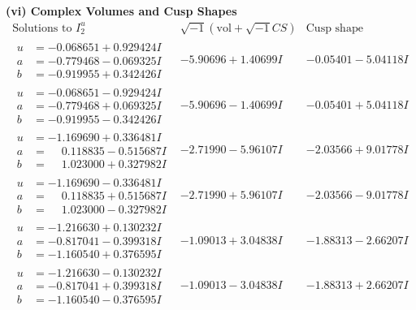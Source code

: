 \documentclass[1p]{elsarticle_modified}
\theoremstyle{definition}
\newcommand{\I}{\sqrt{-1}}
\begin{document}
\newpage\flushleft \textbf{(vi) Complex Volumes and Cusp Shapes}
$$\begin{array}{c|c|c}  
\text{Solutions to }I^u_{2}& \I (\text{vol} + \sqrt{-1}CS) & \text{Cusp shape}\\
 \hline 
\begin{aligned}
u &= -0.068651 + 0.929424 I \\
a &= -0.779468 - 0.069325 I \\
b &= -0.919955 + 0.342426 I\end{aligned}
 & -5.90696 + 1.40699 I & -0.05401 - 5.04118 I \\ \hline\begin{aligned}
u &= -0.068651 - 0.929424 I \\
a &= -0.779468 + 0.069325 I \\
b &= -0.919955 - 0.342426 I\end{aligned}
 & -5.90696 - 1.40699 I & -0.05401 + 5.04118 I \\ \hline\begin{aligned}
u &= -1.169690 + 0.336481 I \\
a &= \phantom{-}0.118835 - 0.515687 I \\
b &= \phantom{-}1.023000 + 0.327982 I\end{aligned}
 & -2.71990 - 5.96107 I & -2.03566 + 9.01778 I \\ \hline\begin{aligned}
u &= -1.169690 - 0.336481 I \\
a &= \phantom{-}0.118835 + 0.515687 I \\
b &= \phantom{-}1.023000 - 0.327982 I\end{aligned}
 & -2.71990 + 5.96107 I & -2.03566 - 9.01778 I \\ \hline\begin{aligned}
u &= -1.216630 + 0.130232 I \\
a &= -0.817041 - 0.399318 I \\
b &= -1.160540 + 0.376595 I\end{aligned}
 & -1.09013 + 3.04838 I & -1.88313 - 2.66207 I \\ \hline\begin{aligned}
u &= -1.216630 - 0.130232 I \\
a &= -0.817041 + 0.399318 I \\
b &= -1.160540 - 0.376595 I\end{aligned}
 & -1.09013 - 3.04838 I & -1.88313 + 2.66207 I \\ \hline\begin{aligned}

\end{aligned}
\end{array}$$
\end{document}
